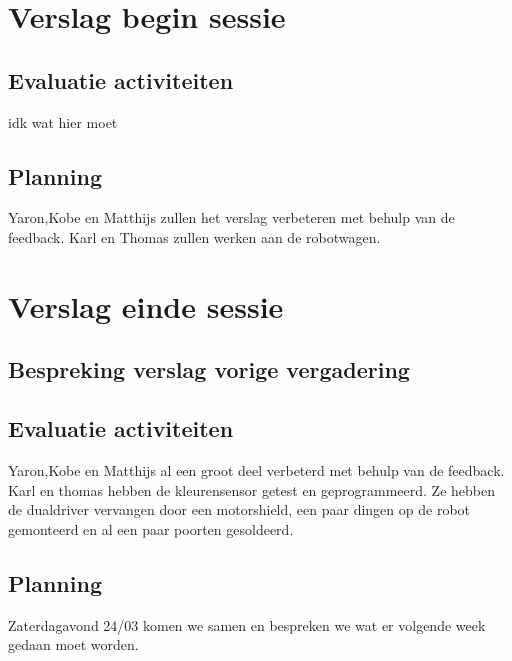 \documentclass[12pt]{article}
\begin{document}
	\section{Verslag begin sessie}
	\subsection{Evaluatie activiteiten}
	
	idk wat hier moet
	
	\subsection{Planning}
	
	Yaron,Kobe en Matthijs zullen het verslag verbeteren met behulp van de feedback.
	Karl en Thomas zullen werken aan de robotwagen.
	
	
	\section{Verslag einde sessie}
	\subsection{Bespreking verslag vorige vergadering}
	\subsection{Evaluatie activiteiten}
	
	Yaron,Kobe en Matthijs al een groot deel verbeterd met behulp van de feedback.
	Karl en thomas hebben de kleurensensor getest en geprogrammeerd. Ze hebben de dualdriver vervangen door een motorshield,
	een paar dingen op de robot gemonteerd en al een paar poorten gesoldeerd.
	
	
	
	
	\subsection{Planning}
	Zaterdagavond 24/03 komen we samen en bespreken we wat er volgende week gedaan moet worden.
	

	
	
	

	
	
	
\end{document}
